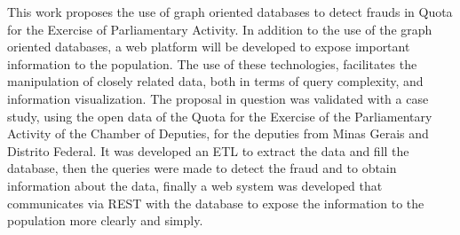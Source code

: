	This work proposes the use of graph oriented databases to detect frauds in Quota for the Exercise of Parliamentary Activity. In addition to the use of the graph oriented databases, a web platform will be developed to expose important information to the population. The use of these technologies, facilitates the manipulation of closely related data, both in terms of query complexity, and information visualization. The proposal in question was validated with a case study, using the open data of the Quota for the Exercise of the Parliamentary Activity of the Chamber of Deputies, for the deputies from Minas Gerais and Distrito Federal. It was developed an ETL to extract the data and fill the database, then the queries were made to detect the fraud and to obtain information about the data, finally a web system was developed that communicates via REST with the database to expose the information to the population more clearly and simply.